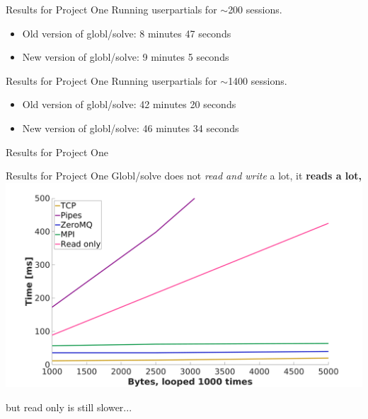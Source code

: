\documentclass{beamer}
\begin{document}
    \begin{frame}{Results for Project One}
        Running userpartials for $\sim$200 sessions.
        \pause
        \begin{itemize}[<+-|alert@+>]
            \item Old version of globl/solve: 8 minutes 47 seconds
            \item New version of globl/solve: 9 minutes 5 seconds
        \end{itemize}
    \end{frame}
     \begin{frame}{Results for Project One}
        Running userpartials for $\sim$1400 sessions.
        \pause
        \begin{itemize}[<+-|alert@+>]
            \item Old version of globl/solve: 42 minutes 20 seconds
            \item New version of globl/solve: 46 minutes 34 seconds
        \end{itemize}
    \end{frame}
   \begin{frame}{Results for Project One}
    \end{frame}
    \begin{frame}{Results for Project One}
        Globl/solve does not \emph{read and write} a lot, it \bf{reads} a lot,
        \centering
        \includegraphics[width=1\columnwidth]{thousandrun}

        but read only is still slower...
    \end{frame}
\end{document}
